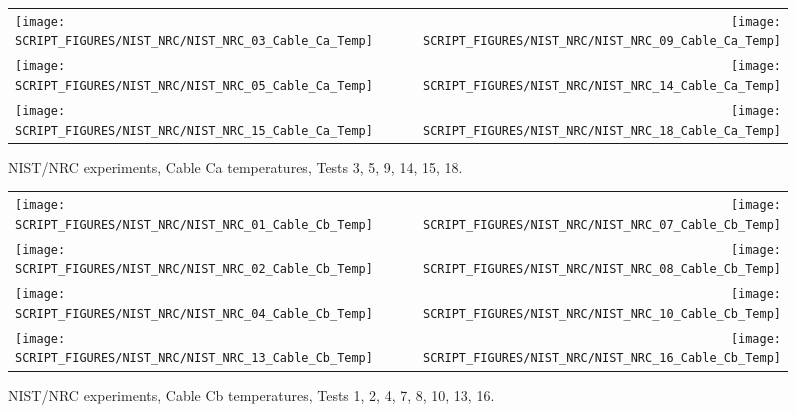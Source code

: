 \begin{figure}[p]
\begin{tabular*}{\textwidth}{l@{\extracolsep{\fill}}r}
\texttt{[image: SCRIPT\_FIGURES/NIST\_NRC/NIST\_NRC\_03\_Cable\_Ca\_Temp]} &
\texttt{[image: SCRIPT\_FIGURES/NIST\_NRC/NIST\_NRC\_09\_Cable\_Ca\_Temp]} \\
\texttt{[image: SCRIPT\_FIGURES/NIST\_NRC/NIST\_NRC\_05\_Cable\_Ca\_Temp]} &
\texttt{[image: SCRIPT\_FIGURES/NIST\_NRC/NIST\_NRC\_14\_Cable\_Ca\_Temp]} \\
\texttt{[image: SCRIPT\_FIGURES/NIST\_NRC/NIST\_NRC\_15\_Cable\_Ca\_Temp]} &
\texttt{[image: SCRIPT\_FIGURES/NIST\_NRC/NIST\_NRC\_18\_Cable\_Ca\_Temp]}
\end{tabular*}
\caption[NIST/NRC experiments, Cable Ca temperatures, Tests 3, 5, 9, 14, 15, 18]{NIST/NRC experiments, Cable Ca temperatures, Tests 3, 5, 9, 14, 15, 18.}
\label{NIST_NRC_Cable_Ca_Open}
\end{figure}

\begin{figure}[p]
\begin{tabular*}{\textwidth}{l@{\extracolsep{\fill}}r}
\texttt{[image: SCRIPT\_FIGURES/NIST\_NRC/NIST\_NRC\_01\_Cable\_Cb\_Temp]} &
\texttt{[image: SCRIPT\_FIGURES/NIST\_NRC/NIST\_NRC\_07\_Cable\_Cb\_Temp]} \\
\texttt{[image: SCRIPT\_FIGURES/NIST\_NRC/NIST\_NRC\_02\_Cable\_Cb\_Temp]} &
\texttt{[image: SCRIPT\_FIGURES/NIST\_NRC/NIST\_NRC\_08\_Cable\_Cb\_Temp]} \\
\texttt{[image: SCRIPT\_FIGURES/NIST\_NRC/NIST\_NRC\_04\_Cable\_Cb\_Temp]} &
\texttt{[image: SCRIPT\_FIGURES/NIST\_NRC/NIST\_NRC\_10\_Cable\_Cb\_Temp]} \\
\texttt{[image: SCRIPT\_FIGURES/NIST\_NRC/NIST\_NRC\_13\_Cable\_Cb\_Temp]} &
\texttt{[image: SCRIPT\_FIGURES/NIST\_NRC/NIST\_NRC\_16\_Cable\_Cb\_Temp]}
\end{tabular*}
\caption[NIST/NRC experiments, Cable Cb temperatures, Tests 1, 2, 4, 7, 8, 10, 13, 16]{NIST/NRC experiments, Cable Cb temperatures, Tests 1, 2, 4, 7, 8, 10, 13, 16.}
\label{NIST_NRC_Cable_Cb_Closed}
\end{figure}

